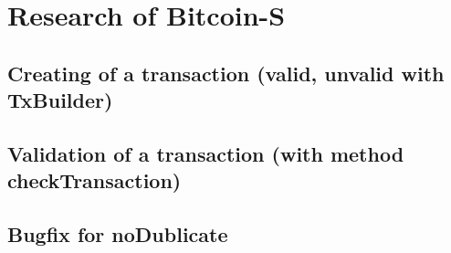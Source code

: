 \chapter{Research of Bitcoin-S}
\label{chap:research_bitcoins}

\section{Creating of a transaction (valid, unvalid with TxBuilder)}

\section{Validation of a transaction (with method checkTransaction)}

\section{{Bugfix for noDublicate}}